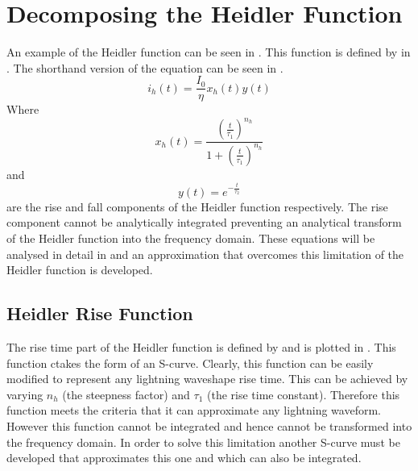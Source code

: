 \section{Decomposing the Heidler Function}
\label{sec:developing_approximation}
An example of the Heidler function can be seen in . This function is defined by  in .
The shorthand version of the equation can be seen in .
\begin{equation}
i_h \left( t \right) = \frac{I_0}{\eta} x_h \left( t \right) y \left( t \right)
\label{eqn:HFsmall}
\end{equation}
Where
\begin{equation}
    x_h \left( t \right) = \frac{{\left (\frac{t}{\tau_1} \right )}^{n_h}}{1 + {\left (\frac{t}{\tau_1} \right )}^{n_h}}
    \label{eqn:HFrise}
\end{equation}
and
\begin{equation}
    y \left( t \right) = e^{-\frac{t}{\tau_2}}
    \label{eqn:HFfall}
\end{equation}
 are the rise and fall components of the Heidler function respectively. The rise component cannot be analytically integrated preventing an analytical transform of the Heidler function into the frequency domain. These equations will be analysed in detail in  and an approximation that overcomes this limitation of the Heidler function is developed.

\subsection{Heidler Rise Function}
\label{sub:approx_heidler_rise_function}

The rise time part of the Heidler function is defined by  and is plotted in . This function ctakes the form of an S-curve. Clearly, this function can be easily modified to represent any lightning waveshape rise time. This can be achieved by varying $n_h$ (the steepness factor) and $\tau_1$ (the rise time constant). Therefore this function meets the criteria that it can approximate any lightning waveform. However this function cannot be integrated and hence cannot be transformed into the frequency domain. In order to solve this limitation another S-curve must be developed that approximates this one and which can also be integrated.

